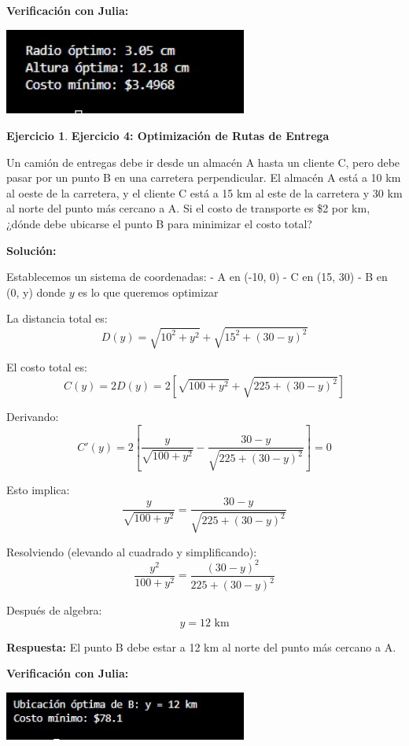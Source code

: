 \documentclass[12pt, a4paper, oneside]{book}
\theoremstyle{definition}
\newtheorem{ejercicio}{Ejercicio}[chapter]
\begin{document}
\textbf{Verificación con Julia:}


\begin{center}
\includegraphics[width=0.6\textwidth]{ejercicio3fm.png}
\end{center}

\begin{ejercicio}
\textbf{Ejercicio 4: Optimización de Rutas de Entrega}

Un camión de entregas debe ir desde un almacén A hasta un cliente C, pero debe pasar por un punto B en una carretera perpendicular. El almacén A está a 10 km al oeste de la carretera, y el cliente C está a 15 km al este de la carretera y 30 km al norte del punto más cercano a A. Si el costo de transporte es \$2 por km, ¿dónde debe ubicarse el punto B para minimizar el costo total?
\end{ejercicio}

\textbf{Solución:}

Establecemos un sistema de coordenadas:
- A en (-10, 0)
- C en (15, 30)
- B en (0, y) donde $y$ es lo que queremos optimizar

La distancia total es:
$$D(y) = \sqrt{10^2 + y^2} + \sqrt{15^2 + (30-y)^2}$$

El costo total es:
$$C(y) = 2D(y) = 2[\sqrt{100 + y^2} + \sqrt{225 + (30-y)^2}]$$

Derivando:
$$C'(y) = 2\left[\frac{y}{\sqrt{100 + y^2}} - \frac{30-y}{\sqrt{225 + (30-y)^2}}\right] = 0$$

Esto implica:
$$\frac{y}{\sqrt{100 + y^2}} = \frac{30-y}{\sqrt{225 + (30-y)^2}}$$

Resolviendo (elevando al cuadrado y simplificando):
$$\frac{y^2}{100 + y^2} = \frac{(30-y)^2}{225 + (30-y)^2}$$

Después de algebra:
$$y = 12 \text{ km}$$

\textbf{Respuesta:} El punto B debe estar a 12 km al norte del punto más cercano a A.

\textbf{Verificación con Julia:}


\begin{center}
\includegraphics[width=0.6\textwidth]{ejercicio4fm.png}
\end{center}
\end{document}
